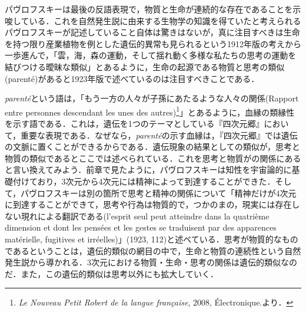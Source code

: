パヴロフスキーは最後の反語表現で，物質と生命が連続的な存在であることを示唆している．これを自然発生説に由来する生物学の知識を得ていたと考えられるパヴロフスキーが記述していること自体は驚きはないが，真に注目すべきは生命を持つ限り産業植物を例とした遺伝的異常も見られるという1912年版の考えから一歩進んで，「雲，海，森の運動，そして揺れ動く多様な私たちの思考の運動を結びつける曖昧な類似」とあるように，生命の起源である物質と思考の類似(parenté)があると1923年版で述べているのは注目すべきことである．

\emph{parenté}という語は，「もう一方の人々が子孫にあたるような人々の関係(Rapport entre personnes descendant les unes des autres)\footnote{\emph{Le Nouveau Petit Robert de la langue française}, 2008, Électronique.より．}」とあるように，血縁の類縁性を示す語である．これは，遺伝を1つのテーマとしている『四次元郷』において，重要な表現である．なぜなら，\emph{parenté}の示す血縁は，『四次元郷』では遺伝の文脈に置くことができるからである．遺伝現象の結果としての類似が，思考と物質の類似であるとここでは述べられている．これを思考と物質がの関係にあると言い換えてみよう．前章で見たように，パヴロフスキーは知性を宇宙論的に基礎付けており，3次元から4次元には精神によって到達することができた．そして，パヴロフスキーは別の箇所で思考と精神の関係について「精神だけが4次元に到達することができて，思考や行為は物質的で，つかのまの，現実には存在しない現れによる翻訳である(l'esprit seul peut atteindre dans la quatrième dimension et dont les pensées et les gestes se traduisent par des apparences matérielle, fugitives et irréelles)」(1923, 112)と述べている．思考が物質的なものであるということは，遺伝的類似の網目の中で，生命と物質の連続性という自然発生説から導かれる．3次元における物質・生命・思考の関係は遺伝的類似なのだ．また，この遺伝的類似は思考以外にも拡大していく．

